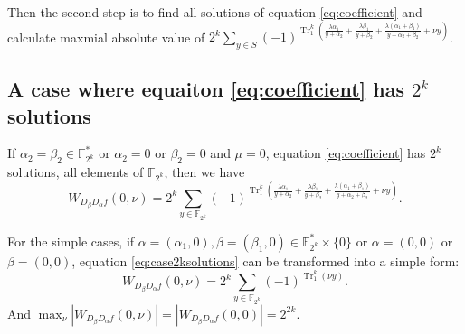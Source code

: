 \documentclass{article}
\newcommand{\F}{\mathbb{F}}
\newcommand{\TRACE}{\operatorname{Tr}_1^k}
\theoremstyle{nonumberplain}
\newcommand{\0}{\textbf{0}}
\newcommand{\1}{\textbf{1}}
\begin{document}

    Then the second step is to find all solutions of equation \eqref{eq:coefficient} and 
    calculate maxmial absolute value of $ 2^k\sum_{y\in S}(-1)^{\TRACE\left(\frac{\lambda\alpha_1}{y+\alpha_2}+\frac{\lambda\beta_1}{y+\beta_2}+\frac{\lambda(\alpha_1+\beta_1)}{y+\alpha_2+\beta_2}+\nu y\right)} $.
    
    
    \subsection{A case where equaiton \eqref{eq:coefficient} has $ 2^k $ solutions }
    If $ \alpha_2=\beta_2\in\F_{2^k}^* $ or $ \alpha_2=0 $ or $ \beta_2=0 $ 
    and $ \mu=0 $, equation \eqref{eq:coefficient} has $ 2^k $ solutions, all elements of $ \F_{2^k} $, 
    then we have 
    \begin{equation}\label{eq:case2ksolutions}
        W_{D_{\beta}D_{\alpha}f}(0,\nu)=2^k\sum_{y\in\F_{2^k}}(-1)^{\TRACE\left(\frac{\lambda\alpha_1}{y+\alpha_2}+\frac{\lambda\beta_1}{y+\beta_2}+\frac{\lambda(\alpha_1+\beta_1)}{y+\alpha_2+\beta_2}+\nu y\right)}.
    \end{equation}

    
    For the simple cases, if $ \alpha=(\alpha_1,0),\beta=(\beta_1,0)\in\F_{2^k}^*\times\{0\} $ 
    or $ \alpha=(0,0) $ or $ \beta=(0,0) $, equation \eqref{eq:case2ksolutions} can be transformed into a simple form:
    \[W_{D_{\beta}D_{\alpha}f}(0,\nu)=2^k\sum_{y\in\F_{2^k}}(-1)^{\TRACE\left(\nu y\right)}.\]
    And $ \max_{\nu}|W_{D_{\beta}D_{\alpha}f}(0,\nu)|=|W_{D_{\beta}D_{\alpha}f}(0,0)|=2^{2k} $.
\end{document}
